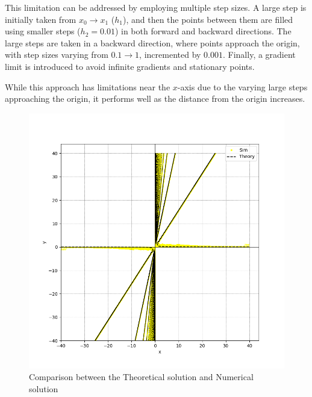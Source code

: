 \documentclass[journal]{IEEEtran}
\begin{document}
	This limitation can be addressed by employing multiple step sizes. A large step is initially taken from \(x_0 \to x_1\) (\(h_1\)), and then the points between them are filled using smaller steps (\(h_2 = 0.01\)) in both forward and backward directions. The large steps are taken in a backward direction, where points approach the origin, with step sizes varying from \(0.1 \to 1\), incremented by \(0.001\). Finally, a gradient limit is introduced to avoid infinite gradients and stationary points.  
	
	While this approach has limitations near the \(x\)-axis due to the varying large steps approaching the origin, it performs well as the distance from the origin increases.
	
	\begin{figure}[h!]
		\centering
		\includegraphics[width=\columnwidth]{figs/fig1.png}
		\caption{Comparison between the Theoretical solution and Numerical solution}
		\label{stemplot}
	\end{figure}
\end{document}

